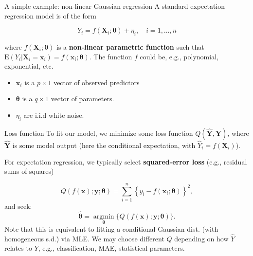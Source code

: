 \documentclass{beamer}
\begin{document}
\begin{frame}{A simple example: non-linear Gaussian regression}
A standard expectation regression model is of the form

$$
Y_{i}=f\left(\mathbf{X}_{i} ; \boldsymbol{\theta}\right)+\eta_{i}, \quad i=1, \ldots, n
$$

where $f\left(\mathbf{X}_{i} ; \boldsymbol{\theta}\right)$ is a \textbf{non-linear parametric function} such that $\mathrm{E}\left(Y_{i}|\mathbf{X}_i=\mathbf{x}_i\right)=f\left(\mathbf{x}_{i} ; \boldsymbol{\theta}\right)$. The function $f$ could be, e.g., polynomial, exponential, etc.
\begin{itemize}
\item $\mathbf{x}_{i}$ is a $p \times 1$ vector of observed predictors

\item $\boldsymbol{\theta}$ is a $q \times 1$ vector of parameters.

\item $\eta_{i}$ are i.i.d white noise.
\end{itemize}
\end{frame}
\begin{frame}{Loss function}
To fit our model, we minimize some loss function $Q(\hat{\mathbf{Y}},\mathbf{Y})$, where $\hat{\mathbf{Y}}$ is some model output (here the conditional expectation, with $\hat{{Y}}_i=f(\mathbf{X}_i)$).


For expectation regression, we typically select \textbf{squared-error loss} (e.g., residual sums of squares)

$$
Q(f(\mathbf{x}) ; \mathbf{y} ; \boldsymbol{\theta})=\sum_{i=1}^{n}\left\{{y}_{i}-f\left(\mathbf{x}_{i} ; \boldsymbol{\theta}\right)\right\}^{2},
$$
and seek:
$$
\hat{\boldsymbol{\theta}}=\underset{\boldsymbol{\theta}}{\operatorname{argmin}}\{Q(f(\mathbf{x}) ; \mathbf{y} ; \boldsymbol{\theta})\}.
$$
Note that this is equivalent to fitting a conditional Gaussian dist. (with homogeneous s.d.) via MLE. We may choose different $Q$ depending on how $\hat{Y}$ relates to $Y$, e.g., classification, MAE, statistical parameters. 
\end{frame}
\end{document}
